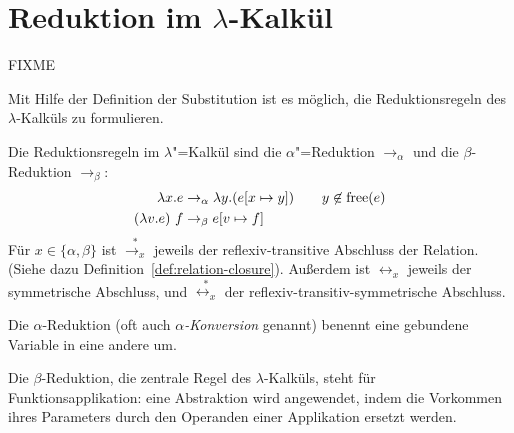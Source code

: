 \section{Reduktion im $\lambda$-Kalkül}

FIXME

Mit Hilfe der Definition der Substitution ist es möglich,
die Reduktionsregeln des $\lambda$-Kalküls zu formulieren. 
%
\begin{definition}[Reduktionsregeln]
  Die Reduktionsregeln im $\lambda$"=Kalkül sind
  die $\alpha$"=Reduktion $\rightarrow_{\alpha}$ und die
  $\beta$-Reduktion $\rightarrow_{\beta}$:%
  \begin{alignat*}{2}
    \lambda x.e & \rightarrow_{\alpha} \lambda y.(e[x\mapsto y]) \quad 
    & y\not\in\operatorname{free}(e)
    \\
    (\lambda v.e)~f & \rightarrow_{\beta} e[v\mapsto f]
  \end{alignat*}
  Für $x\in\{\alpha,\beta\}$ ist $\overset{\ast}{\rightarrow_x}$
  jeweils der reflexiv-transitive Abschluss der Relation.  (Siehe dazu
  Definition~\ref{def:relation-closure}). %
  Außerdem ist
  $\leftrightarrow_x$ jeweils der symmetrische Abschluss, und
  $\overset{\ast}{\leftrightarrow_x}$ der
  reflexiv-transitiv-symmetrische Abschluss.
\end{definition}
%
Die $\alpha$-Reduktion (oft auch \textit{$\alpha$-Konversion} genannt)
benennt eine gebundene Variable in eine andere um.

Die $\beta$-Reduktion, die zentrale Regel des $\lambda$-Kalküls, steht für
Funktionsapplikation: eine Abstraktion
wird angewendet, indem die Vorkommen ihres Parameters durch den
Operanden einer Applikation ersetzt werden.


